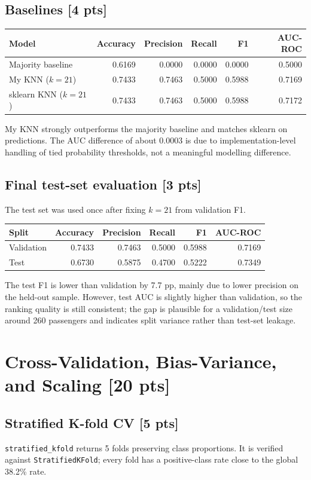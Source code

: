 \documentclass[10pt,a4paper]{article}
\begin{document}
\subsection{Baselines [4 pts]}
\begin{center}\small
\begin{tabular}{lrrrrr}
\toprule
Model & Accuracy & Precision & Recall & F1 & AUC-ROC\\
\midrule
Majority baseline & 0.6169 & 0.0000 & 0.0000 & 0.0000 & 0.5000\\
My KNN ($k=21$) & 0.7433 & 0.7463 & 0.5000 & 0.5988 & 0.7169\\
sklearn KNN ($k=21$) & 0.7433 & 0.7463 & 0.5000 & 0.5988 & 0.7172\\
\bottomrule
\end{tabular}
\end{center}
My KNN strongly outperforms the majority baseline and matches sklearn on predictions. The AUC difference of about 0.0003 is due to implementation-level handling of tied probability thresholds, not a meaningful modelling difference.

\subsection{Final test-set evaluation [3 pts]}
The test set was used once after fixing $k=21$ from validation F1.
\begin{center}\small
\begin{tabular}{lrrrrr}
\toprule
Split & Accuracy & Precision & Recall & F1 & AUC-ROC\\
\midrule
Validation & 0.7433 & 0.7463 & 0.5000 & 0.5988 & 0.7169\\
Test & 0.6730 & 0.5875 & 0.4700 & 0.5222 & 0.7349\\
\bottomrule
\end{tabular}
\end{center}
The test F1 is lower than validation by 7.7 pp, mainly due to lower precision on the held-out sample. However, test AUC is slightly higher than validation, so the ranking quality is still consistent; the gap is plausible for a validation/test size around 260 passengers and indicates split variance rather than test-set leakage.

\section{Cross-Validation, Bias-Variance, and Scaling [20 pts]}
\subsection{Stratified K-fold CV [5 pts]}
\texttt{stratified\_kfold} returns 5 folds preserving class proportions. It is verified against \texttt{StratifiedKFold}; every fold has a positive-class rate close to the global 38.2\% rate.
\end{document}
